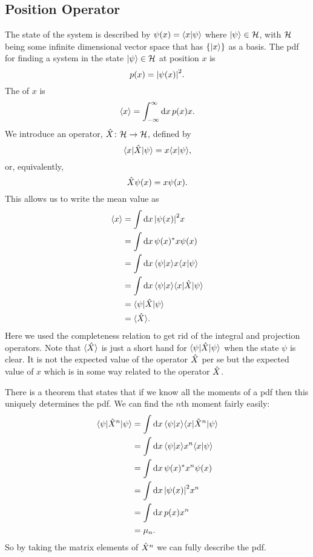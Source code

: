     \subsection{Position Operator}
    The state of the system is described by \(\psi(x) = \langle {x} \vert {\psi} \rangle\) where \(\vert {\psi} \rangle\in\mathcal{H}\), with \(\mathcal{H}\) being some infinite dimensional vector space that has \(\{\vert {x} \rangle\}\) as a basis.
    The \acrshort{pdf} for finding a system in the state \(\vert {\psi} \rangle\in\mathcal{H}\) at position \(x\) is
    \[p(x) = \abs{\psi(x)}^2.\]
    The  of \(x\) is
    \[\langle{x}\rangle = \int_{-\infty}^{\infty} \dd{x}p(x)x.\]
    We introduce an operator, \(\hat{X}\colon\mathcal{H}\to\mathcal{H}\), defined by
    \[\langle {x} \vert\hat{X}\vert {\psi} \rangle = x\langle {x} \vert {\psi} \rangle,\]
    or, equivalently,
    \[\hat{X}\psi(x) = x\psi(x).\]
    This allows us to write the mean value as
    \begin{align*}
        \langle{x}\rangle &= \int\dd{x}\abs{\psi(x)}^2x\\
        &= \int\dd{x}\psi(x)^*x\psi(x)\\
        &= \int\dd{x}\langle {\psi} \vert {x} \rangle x\langle {x} \vert {\psi} \rangle\\
        &= \int\dd{x}\langle {\psi} \vert {x} \rangle\langle {x} \vert\hat{X}\vert {\psi} \rangle\\
        &= \langle {\psi} \vert\hat{X}\vert {\psi} \rangle\\
        &= \langle{\hat{X}}\rangle.
    \end{align*}
    Here we used the completeness relation to get rid of the integral and projection operators.
    Note that \(\langle{\hat{X}}\rangle\) is just a short hand for \(\langle {\psi} \vert\hat{X}\vert {\psi} \rangle\) when the state \(\psi\) is clear.
    It is not the expected value of the operator \(\hat{X}\) per se but the expected value of \(x\) which is in some way related to the operator \(\hat{X}\).
    
    There is a theorem that states that if we know all the moments of a \acrshort{pdf} then this uniquely determines the \acrshort{pdf}.
    We can find the \(n\)th moment fairly easily:
    \begin{align*}
        \langle {\psi} \vert\hat{X}^n\vert {\psi} \rangle &= \int \dd{x} \langle {\psi} \vert {x} \rangle\langle {x} \vert\hat{X}^n\vert {\psi} \rangle\\
        &= \int \dd{x} \langle {\psi} \vert {x} \rangle x^n\langle {x} \vert {\psi} \rangle\\
        &= \int \dd{x} \psi(x)^* x^n \psi(x)\\
        &= \int \dd{x} \abs{\psi(x)}^2x^n\\
        &= \int \dd{x} p(x)x^n\\
        &= \mu_n.
    \end{align*}
    So by taking the matrix elements of \(\hat{X}^n\) we can fully describe the \acrshort{pdf}.
    
